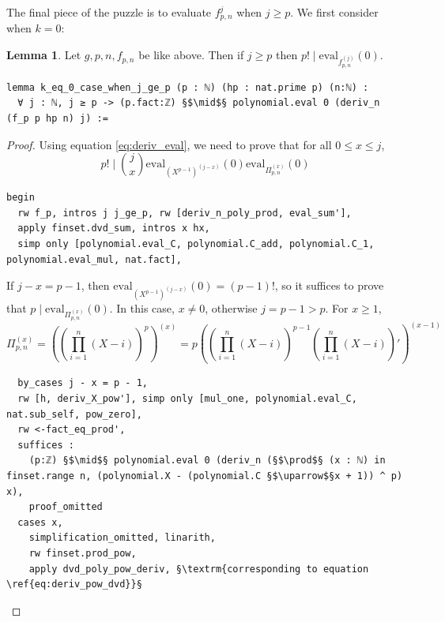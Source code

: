 \documentclass{report}
\theoremstyle{definition}
\newtheorem{lemma}{Lemma}[section]
\begin{document}
The final piece of the puzzle is to evaluate $f_{p,n}^{j}$ when $j\ge p$. We first consider when $k=0$:
\begin{lemma}\label{lemma:ge_p0}
Let $g,p,n,f_{p,n}$ be like above. Then if $j\ge p$ then $p!\mid\mathrm{eval}_{f_{p,n}^{(j)}}(0)$.

\begin{verbatim}
lemma k_eq_0_case_when_j_ge_p (p : ℕ) (hp : nat.prime p) (n:ℕ) : 
  ∀ j : ℕ, j ≥ p -> (p.fact:ℤ) §$\mid$§ polynomial.eval 0 (deriv_n (f_p p hp n) j) :=
\end{verbatim}
\end{lemma}
\begin{proof}
Using equation \ref{eq:deriv_eval}, we need to prove that for all $0\le x\le j$, 
$$p!\mid {j\choose x}\mathrm{eval}_{(X^{p-1})^{(j-x)}}(0)\mathrm{eval}_{\Pi_{p,n}^{(x)}}(0)$$
\begin{verbatim}
begin
  rw f_p, intros j j_ge_p, rw [deriv_n_poly_prod, eval_sum'], 
  apply finset.dvd_sum, intros x hx, 
  simp only [polynomial.eval_C, polynomial.C_add, polynomial.C_1, polynomial.eval_mul, nat.fact],
\end{verbatim}

If $j-x=p-1$, then $\mathrm{eval}_{(X^{p-1})^{(j-x)}}(0)=(p-1)!$, so it suffices to prove that $p\mid\mathrm{eval}_{\Pi_{p,n}^{(x)}}(0)$. In this case, $x\ne 0$, otherwise $j=p-1>p$. For $x\ge 1$,
\begin{equation}\label{eq:deriv_pow_dvd}
\Pi_{p,n}^{(x)}=\left(\left(\prod_{i=1}^n(X-i)\right)^p\right)^{(x)}=p\left(\left(\prod_{i=1}^n(X-i)\right)^{p-1}\left(\prod_{i=1}^n(X-i)\right)'\right)^{(x-1)}
\end{equation}

\begin{verbatim}
  by_cases j - x = p - 1,
  rw [h, deriv_X_pow'], simp only [mul_one, polynomial.eval_C, nat.sub_self, pow_zero],
  rw <-fact_eq_prod',
  suffices : 
    (p:ℤ) §$\mid$§ polynomial.eval 0 (deriv_n (§$\prod$§ (x : ℕ) in finset.range n, (polynomial.X - (polynomial.C §$\uparrow$§x + 1)) ^ p) x),
    proof_omitted
  cases x,
    simplification_omitted, linarith,
    rw finset.prod_pow, 
    apply dvd_poly_pow_deriv, §\textrm{corresponding to equation \ref{eq:deriv_pow_dvd}}§
\end{verbatim}


\end{proof}
\end{document}
